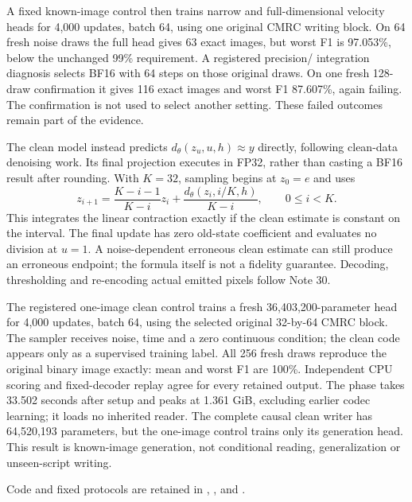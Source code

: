 \documentclass[10pt,a4paper]{article}
\begin{document}
A fixed known-image control then trains narrow and full-dimensional velocity
heads for 4,000 updates, batch 64, using one original CMRC writing block.
On 64 fresh noise draws the full head gives 63 exact images, but worst F1
is 97.053\%, below the unchanged 99\% requirement. A registered precision/
integration diagnosis selects BF16 with 64 steps on those original draws.
On one fresh 128-draw confirmation it gives 116 exact images and worst F1
87.607\%, again failing. The confirmation is not used to select another
setting. These failed outcomes remain part of the evidence.

The clean model instead predicts $d_\theta(z_u,u,h)\approx y$ directly,
following clean-data denoising work\cite{jit}. Its final projection executes
in FP32, rather than casting a BF16 result after rounding. With $K=32$,
sampling begins at $z_0=e$ and uses
\begin{equation}
 z_{i+1}=\frac{K-i-1}{K-i}z_i+
 \frac{d_\theta(z_i,i/K,h)}{K-i},\qquad 0\leq i<K.
\end{equation}
This integrates the linear contraction exactly if the clean estimate is
constant on the interval. The final update has zero old-state coefficient
and evaluates no division at $u=1$. A noise-dependent erroneous clean
estimate can still produce an erroneous endpoint; the formula itself is
not a fidelity guarantee. Decoding, thresholding and re-encoding actual
emitted pixels follow Note 30.

The registered one-image clean control trains a fresh 36,403,200-parameter
head for 4,000 updates, batch 64, using the selected original 32-by-64 CMRC
block. The sampler receives noise, time and a zero continuous condition;
the clean code appears only as a supervised training label. All 256 fresh
draws reproduce the original binary image exactly: mean and worst F1 are
100\%. Independent CPU scoring and fixed-decoder replay agree for every
retained output. The phase takes 33.502 seconds after setup and peaks at
1.361 GiB, excluding earlier codec learning; it loads no inherited reader.
The complete causal clean writer has 64,520,193 parameters, but the one-image
control trains only its generation head. This result is known-image
generation, not conditional reading, generalization or unseen-script writing.

Code and fixed protocols are retained in
,
,
 and
.
\end{document}

